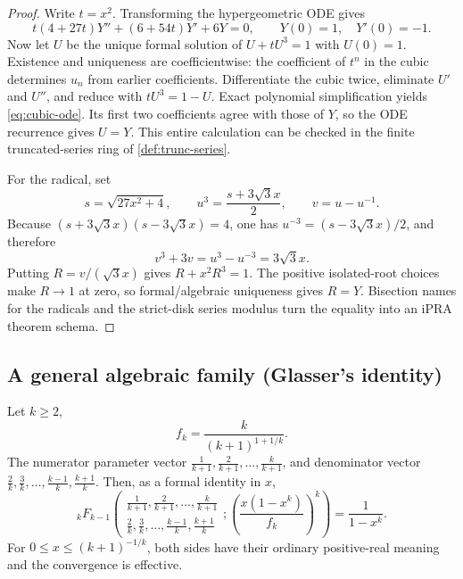 \begin{proof}
Write \(t=x^2\).  Transforming the hypergeometric ODE gives
\begin{equation}\label{eq:cubic-ode}
 t(4+27t)Y''+(6+54t)Y'+6Y=0,
 \qquad Y(0)=1,\quad Y'(0)=-1.
\end{equation}
Now let \(U\) be the unique formal solution of \(U+tU^3=1\) with
\(U(0)=1\).  Existence and uniqueness are coefficientwise: the coefficient of
\(t^n\) in the cubic determines \(u_n\) from earlier coefficients.  Differentiate
the cubic twice, eliminate \(U'\) and \(U''\), and reduce with
\(tU^3=1-U\).  Exact polynomial simplification yields
\eqref{eq:cubic-ode}.  Its first two coefficients agree with those of \(Y\),
so the ODE recurrence gives \(U=Y\).  This entire calculation can be checked
in the finite truncated-series ring of \cref{def:trunc-series}.

For the radical, set
\[
 s=\sqrt{27x^2+4},\qquad
 u^3=\frac{s+3\sqrt3x}{2},\qquad v=u-u^{-1}.
\]
Because \((s+3\sqrt3x)(s-3\sqrt3x)=4\), one has
\(u^{-3}=(s-3\sqrt3x)/2\), and therefore
\[
 v^3+3v=u^3-u^{-3}=3\sqrt3x.
\]
Putting \(R=v/(\sqrt3x)\) gives \(R+x^2R^3=1\).  The positive isolated-root
choices make \(R\to1\) at zero, so formal/algebraic uniqueness gives
\(R=Y\).  Bisection names for the radicals and the strict-disk series modulus
turn the equality into an iPRA theorem schema.
\end{proof}

\subsection{A general algebraic family (Glasser's identity)}

\begin{theorem}\label{thm:glasser}
Let \(k\ge2\),
\[
 f_k=\frac{k}{(k+1)^{1+1/k}}.
\]
The numerator parameter vector
\(\frac1{k+1},\frac2{k+1},\ldots,\frac{k}{k+1}\), and denominator vector
\(\frac2k,\frac3k,\ldots,\frac{k-1}k,\frac{k+1}k\).  Then, as a formal
identity in \(x\),
\begin{equation}\label{eq:glasser}
 {}_kF_{k-1}\!\left(
 \begin{matrix}\frac1{k+1},\frac2{k+1},\ldots,\frac{k}{k+1}\\
 \frac2k,\frac3k,\ldots,\frac{k-1}k,\frac{k+1}k
 \end{matrix};
 \left(\frac{x(1-x^k)}{f_k}\right)^k\right)
 =\frac1{1-x^k}.
\end{equation}
For \(0\le x\le(k+1)^{-1/k}\), both sides have their ordinary positive-real
meaning and the convergence is effective.
\end{theorem}

